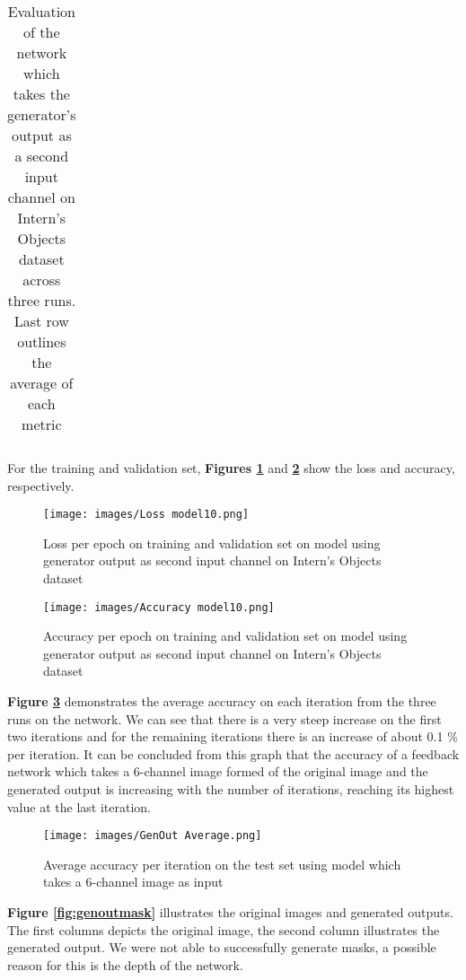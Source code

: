 \documentclass{l4proj}
\begin{document}
\begin{table}[H]
\begin{tabular}{|l|l|l|l|l|l|l|l|}
\end{tabular}
\caption{Evaluation of the network which takes the generator's output as a second input channel on Intern's Objects dataset across three runs. Last row outlines the average of each metric}
\label{tab:genout}
\end{table}

For the training and validation set, \textbf{Figures \ref{fig:genoutloss}} and \textbf{\ref{fig:genoutaccuracy}} show the loss and accuracy, respectively.

\begin{figure}[H]
    \centering
    \texttt{[image: images/Loss model10.png]}
    \caption{Loss per epoch on training and validation set on model using generator output as second input channel on Intern's Objects dataset}
    \label{fig:genoutloss} 
\end{figure}

\begin{figure}[H]
    \centering
    \texttt{[image: images/Accuracy model10.png]}
    \caption{Accuracy per epoch on training and validation set on model using generator output as second input channel on Intern's Objects dataset}
    \label{fig:genoutaccuracy} 
\end{figure}

\textbf{Figure \ref{fig:genoutav}} demonstrates the average accuracy on each iteration from the three runs on the network. We can see that there is a very steep increase on the first two iterations and for the remaining iterations there is an increase of about 0.1 \% per iteration.
It can be concluded from this graph that the accuracy of a feedback network which takes a 6-channel image formed of the original image and the generated output is increasing with the number of iterations, reaching its highest value at the last iteration.

\begin{figure}[H]
    \centering
    \texttt{[image: images/GenOut Average.png]}
    \caption{Average accuracy per iteration on the test set using model which takes a 6-channel image as input}
    \label{fig:genoutav} 
\end{figure}

\textbf{Figure \ref{fig:genoutmask}} illustrates the original images and generated outputs. The first columns depicts the original image, the second column illustrates the generated output. We were not able to successfully generate masks, a possible reason for this is the depth of the network.
\end{document}
